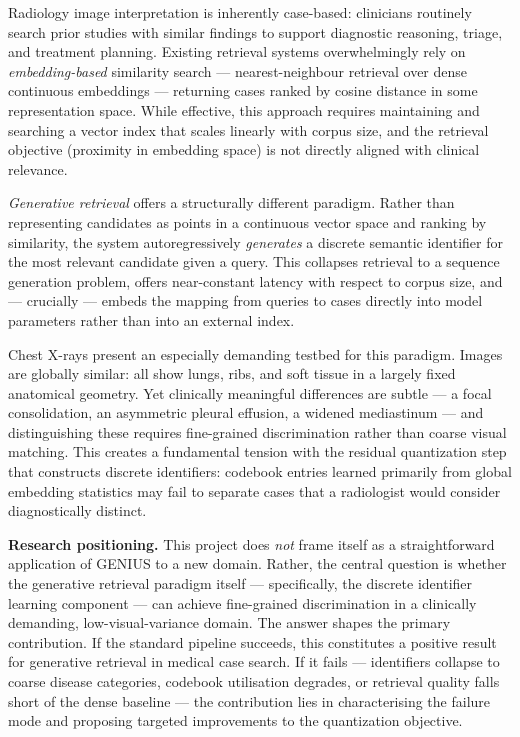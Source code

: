 \documentclass[11pt,a4paper]{article}
\begin{document}
Radiology image interpretation is inherently case-based: clinicians routinely
search prior studies with similar findings to support diagnostic reasoning,
triage, and treatment planning.
Existing retrieval systems overwhelmingly rely on \emph{embedding-based}
similarity search --- nearest-neighbour retrieval over dense continuous
embeddings --- returning cases ranked by cosine distance in some representation
space.
While effective, this approach requires maintaining and searching a vector index
that scales linearly with corpus size, and the retrieval objective (proximity
in embedding space) is not directly aligned with clinical relevance.

\emph{Generative retrieval} offers a structurally different paradigm.
Rather than representing candidates as points in a continuous vector space and
ranking by similarity, the system autoregressively \emph{generates} a discrete
semantic identifier for the most relevant candidate given a query.
This collapses retrieval to a sequence generation problem, offers near-constant
latency with respect to corpus size, and --- crucially --- embeds the mapping
from queries to cases directly into model parameters rather than into an
external index.

Chest X-rays present an especially demanding testbed for this paradigm.
Images are globally similar: all show lungs, ribs, and soft tissue in a largely
fixed anatomical geometry.
Yet clinically meaningful differences are subtle ---
a focal consolidation, an asymmetric pleural effusion, a widened mediastinum ---
and distinguishing these requires fine-grained discrimination rather than
coarse visual matching.
This creates a fundamental tension with the residual quantization step that
constructs discrete identifiers: codebook entries learned primarily from global
embedding statistics may fail to separate cases that a radiologist would
consider diagnostically distinct.

\textbf{Research positioning.}
This project does \emph{not} frame itself as a straightforward application of
GENIUS to a new domain.
Rather, the central question is whether the generative retrieval paradigm
itself --- specifically, the discrete identifier learning component --- can
achieve fine-grained discrimination in a clinically demanding,
low-visual-variance domain.
The answer shapes the primary contribution.
If the standard pipeline succeeds, this constitutes a positive result for
generative retrieval in medical case search.
If it fails --- identifiers collapse to coarse disease categories, codebook
utilisation degrades, or retrieval quality falls short of the dense baseline ---
the contribution lies in characterising the failure mode and proposing targeted
improvements to the quantization objective.
\end{document}
